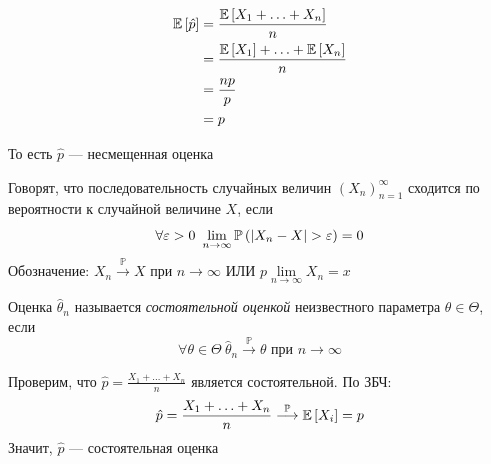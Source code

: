 \documentclass[a4paper, 10pt]{article}
\begin{document}
\begin{equation*}
    \begin{aligned}
        \mathbb{E}\left[\hat{p}\right]&=\frac{\mathbb{E}\left[X_1+\ldots+X_n\right]}{n}\\
        &=\frac{\mathbb{E}\left[X_1\right]+\ldots+\mathbb{E}\left[X_n\right]}{n}\\
        &=\frac{np}{p}\\
        &=p
    \end{aligned}
\end{equation*}

То есть $\hat{p}$ — несмещенная оценка

 Говорят, что последовательность случайных величин $(X_n)_{n=1}^{\infty}$ сходится по вероятности к случайной величине $X$, если
\begin{equation*}
    \forall \varepsilon>0\ \lim\limits_{n\to\infty}\prob{|X_n-X|>\varepsilon}=0
\end{equation*}
Обозначение: $X_n\overset{\mathbb{P}}{\longrightarrow}X$ при $n\to\infty$ ИЛИ $p\lim\limits_{n\to\infty} X_n=x$

 Оценка $\hat{\theta}_n$ называется \textit{состоятельной оценкой} неизвестного параметра $\theta\in\Theta$, если
\begin{equation*}
    \forall \theta\in\Theta\ \hat{\theta}_n\overset{\mathbb{P}}{\longrightarrow}\theta\text{ при }n\to\infty
\end{equation*}

\ex Проверим, что $\hat{p}=\displaystyle\frac{X_1+\ldots+X_n}{n}$ является состоятельной. По ЗБЧ:
\begin{equation*}
    \begin{aligned}
        \hat{p}=\displaystyle\frac{X_1+\ldots+X_n}{n}\overset{\mathbb{P}}{\longrightarrow}\mathbb{E}\left[X_i\right]=p
    \end{aligned}
\end{equation*}
Значит, $\hat{p}$ — состоятельная оценка
\end{document}
